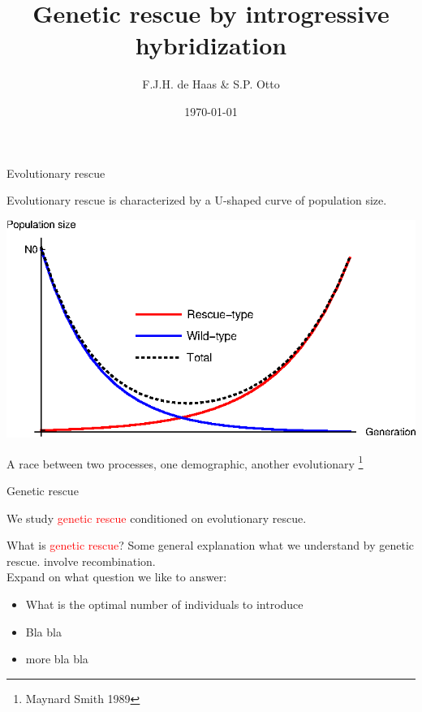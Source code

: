 \documentclass{beamer}
\title[lab meeting]{Genetic rescue by introgressive hybridization} %
\author{F.J.H. de Haas \& S.P. Otto} %
\date{\today} %
\begin{document}
\begin{frame}
\titlepage %
\end{frame}

\begin{frame}{Evolutionary rescue}

Evolutionary rescue is characterized by a U-shaped curve of population size.

\includegraphics[width=0.8\columnwidth]{Rfiles/figures/WhatisRescue.eps}

A race between two processes, one demographic, another evolutionary \footnote{Maynard Smith 1989}

\end{frame}

\begin{frame}{Genetic rescue}

    We study \textcolor{red}{genetic rescue} conditioned on evolutionary rescue.

    What is \textcolor{red}{genetic rescue}? Some general explanation what we understand by genetic rescue. involve recombination. \\
    
    Expand on what question we like to answer:
    
    \begin{itemize}
        \item What is the optimal number of individuals to introduce
        \item Bla bla
        \item more bla bla
    \end{itemize}
\end{frame}
\end{document}
